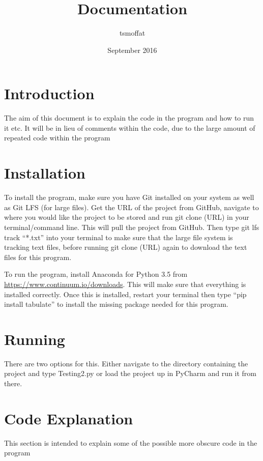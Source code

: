 \documentclass{article}
\title{Documentation}
\author{tsmoffat}
\date{September 2016}
\newcommand{\q}[1]{``#1''}
\begin{document}
\maketitle

\section{Introduction}
The aim of this document is to explain the code in the program and how to run it etc. It will be in lieu of comments within the code, due to the large amount of repeated code
within the program

\section{Installation}
To install the program, make sure you have Git installed on your system as well as Git LFS (for large files). Get the URL of the project from GitHub, navigate to
where you would like the project to be stored and run git clone (URL) in your terminal/command line. This will pull the project from GitHub. Then type git lfs track
\q{*.txt} into your terminal to make sure that the large file system is tracking text files, before running git clone (URL) again to download the text files for this program.
 \par To run the program, install Anaconda for Python 3.5 from \url{https://www.continuum.io/downloads}. This will make sure that everything is installed correctly. Once this
 is installed, restart your terminal then type \q{pip install tabulate} to install the missing package needed for this program.


\section{Running}
There are two options for this. Either navigate to the directory containing the project and type Testing2.py
or load the project up in PyCharm and run it from there.

\section{Code Explanation}
This section is intended to explain some of the possible more obscure code in the program
\end{document}
